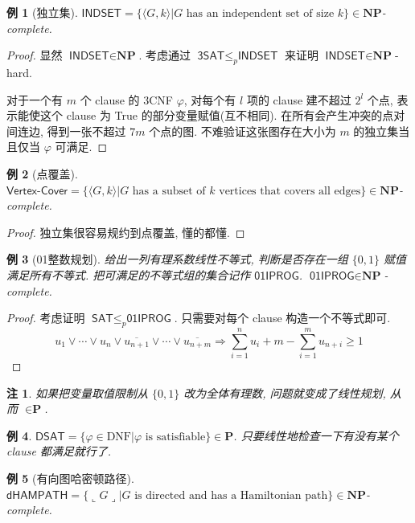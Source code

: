 \documentclass[8pt]{article}
\theoremstyle{compact}
\newtheorem{example}{例}[section]
\newtheorem{remark}{注}[section]
\def\le{\leqslant}
\def\ge{\geqslant}
\def\rep#1{\llcorner{#1}\lrcorner}
\def\P{\textbf{P}}
\def\NP{\textbf{NP}}
\begin{document}
\begin{example}[独立集]
	$\textsf{INDSET} = \{\langle G, k \rangle | G \text{ has an independent set of size } k\} \in \NP$-complete.
\end{example}
\begin{proof}
	显然 $\textsf{INDSET} \in \NP$. 考虑通过 $\textsf{3SAT} \le_p \textsf{INDSET}$ 来证明 $\textsf{INDSET} \in \NP$-hard.

	对于一个有 $m$ 个 clause 的 3CNF $\varphi$, 对每个有 $l$ 项的 clause 建不超过 $2^l$ 个点, 表示能使这个 clause 为 True 的部分变量赋值(互不相同). 在所有会产生冲突的点对间连边, 得到一张不超过 $7m$ 个点的图. 不难验证这张图存在大小为 $m$ 的独立集当且仅当 $\varphi$ 可满足.
\end{proof}
\begin{example}[点覆盖]
	$\textsf{Vertex-Cover} = \{\langle G, k \rangle | G \text{ has a subset of } k \text{ vertices that covers all edges}\} \in \NP$-complete.
\end{example}
\begin{proof}
	独立集很容易规约到点覆盖, 懂的都懂.
\end{proof}
\begin{example}[01整数规划]
	给出一列有理系数线性不等式, 判断是否存在一组 $\{0, 1\}$ 赋值满足所有不等式. 把可满足的不等式组的集合记作 $\textsf{01IPROG}$. $\textsf{01IPROG} \in \NP$-complete.
\end{example}
\begin{proof}
	考虑证明 $\textsf{SAT} \le_p \textsf{01IPROG}$. 只需要对每个 clause 构造一个不等式即可.
	$$u_1 \vee \cdots \vee u_n \vee \overline{u_{n+1}} \vee \cdots \vee \overline{u_{n+m}} \Rightarrow \sum_{i=1}^{n}u_i + m - \sum_{i=1}^{m}u_{n+i} \ge 1$$
\end{proof}
\begin{remark}
	如果把变量取值限制从 $\{0, 1\}$ 改为全体有理数, 问题就变成了线性规划, 从而 $\in \P$.
\end{remark}
\begin{example}
	$\textsf{DSAT} = \{\varphi \in \text{DNF} | \varphi \text{ is satisfiable}\} \in \P$. 只要线性地检查一下有没有某个 clause 都满足就行了.
\end{example}
\begin{example}[有向图哈密顿路径]
	$\textsf{dHAMPATH} = \{\rep{G} | G \text{ is directed and has a Hamiltonian path}\} \in \NP$-complete.
\end{example}
\end{document}
